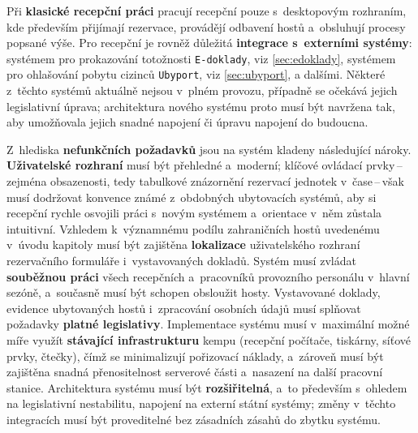 Při \textbf{klasické recepční práci} pracují recepční pouze s~desktopovým rozhraním, kde především přijímají rezervace, provádějí odbavení hostů a~obsluhují procesy popsané výše.
Pro recepční je rovněž důležitá \textbf{integrace s~externími systémy}: systémem pro prokazování totožnosti \texttt{E-doklady}, viz \ref{sec:edoklady}, systémem pro ohlašování pobytu cizinců \texttt{Ubyport}, viz \ref{sec:ubyport}, a dalšími.
Některé z~těchto systémů aktuálně nejsou v~plném provozu, případně se očekává jejich legislativní úprava; architektura nového systému proto musí být navržena tak, aby umožňovala jejich snadné napojení či úpravu napojení do budoucna.

Z~hlediska \textbf{nefunkčních požadavků} jsou na systém kladeny následující nároky.
\textbf{Uživatelské rozhraní} musí být přehledné a~moderní; klíčové ovládací prvky\,--\,zejména  obsazenosti, tedy tabulkové znázornění rezervací jednotek v~čase\,--\,však musí dodržovat konvence známé z~obdobných ubytovacích systémů, aby si recepční rychle osvojili práci s~novým systémem a~orientace v~něm zůstala intuitivní.
Vzhledem k~významnému podílu zahraničních hostů uvedenému v~úvodu kapitoly musí být zajištěna \textbf{lokalizace} uživatelského rozhraní rezervačního formuláře i~vystavovaných dokladů.
Systém musí zvládat \textbf{souběžnou práci} všech recepčních a~pracovníků provozního personálu v~hlavní sezóně, a~současně musí být schopen obsloužit hosty.
Vystavované doklady, evidence ubytovaných hostů i~zpracování osobních údajů musí splňovat požadavky \textbf{platné legislativy}.
Implementace systému musí v~maximální možné míře využít \textbf{stávající infrastrukturu} kempu (recepční počítače, tiskárny, síťové prvky, čtečky), čímž se minimalizují pořizovací náklady, a~zároveň musí být zajištěna snadná přenositelnost serverové části a~nasazení na další pracovní stanice.
Architektura systému musí být \textbf{rozšiřitelná}, a~to především s~ohledem na legislativní nestabilitu, napojení na externí státní systémy; změny v~těchto integracích musí být proveditelné bez zásadních zásahů do zbytku systému.

